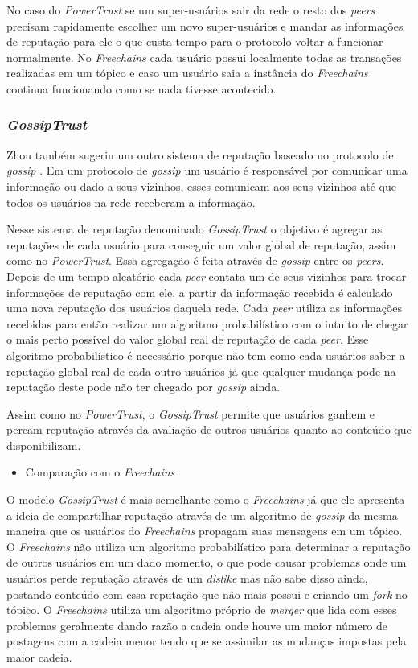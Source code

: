 \documentclass[12pt]{article}
\newcommand{\FC} {\textit{Freechains}\xspace}
\begin{document}
No caso do \textit{PowerTrust} se um super-usuários sair da rede o resto dos \textit{peers} precisam rapidamente escolher um novo super-usuários e mandar as informações de reputação para ele o que custa tempo para o protocolo voltar a funcionar normalmente.
No \FC cada usuário possui localmente todas as transações realizadas em um tópico e caso um usuário saia a instância do \FC continua funcionando como se nada tivesse acontecido.

\subsubsection{\textit{GossipTrust}} \label{subsub:gossiptrust}

Zhou também sugeriu um outro sistema de reputação baseado no protocolo de \textit{gossip} \cite{zhou2007gossip}.
Em um protocolo de \textit{gossip} um usuário é responsável por comunicar uma informação ou dado a seus vizinhos, esses comunicam aos seus vizinhos até que todos os usuários na rede receberam a informação.

Nesse sistema de reputação denominado \textit{GossipTrust} o objetivo é agregar as reputações de cada usuário para conseguir um valor global de reputação, assim como no \textit{PowerTrust}. Essa agregação é feita através de \textit{gossip} entre os \textit{peers}.
Depois de um tempo aleatório cada \textit{peer} contata um de seus vizinhos para trocar informações de reputação com ele, a partir da informação recebida é calculado uma nova reputação dos usuários daquela rede. 
Cada \textit{peer} utiliza as informações recebidas para então realizar um algoritmo probabilístico com o intuito de chegar o mais perto possível do valor global real de reputação de cada \textit{peer}.
Esse algoritmo probabilístico é necessário porque não tem como cada usuários saber a reputação global real de cada outro usuários já que qualquer mudança pode na reputação deste pode não ter chegado por \textit{gossip} ainda.

Assim como no \textit{PowerTrust}, o \textit{GossipTrust} permite que usuários ganhem e percam reputação através da avaliação de outros usuários quanto ao conteúdo que disponibilizam.

\begin{itemize}
    \item Comparação com o \FC
\end{itemize}

O modelo \textit{GossipTrust} é mais semelhante como o \FC já que ele apresenta a ideia de compartilhar reputação através de um algoritmo de \textit{gossip} da mesma maneira que os usuários do \FC propagam suas mensagens em um tópico.
O \FC não utiliza um algoritmo probabilístico para determinar a reputação de outros usuários em um dado momento, o que pode causar problemas onde um usuários perde reputação através de um \textit{dislike} mas não sabe disso ainda, postando conteúdo com essa reputação que não mais possui e criando um \textit{fork} no tópico.
O \FC utiliza um algoritmo próprio de \textit{merger} que lida com esses problemas geralmente dando razão a cadeia onde houve um maior número de postagens com a cadeia menor tendo que se assimilar as mudanças impostas pela maior cadeia.
\end{document}
